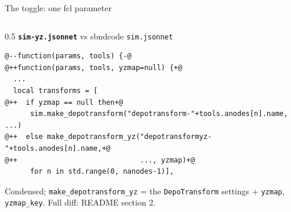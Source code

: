 \documentclass[aspectratio=169,10pt]{beamer}
\newcommand{\code}[1]{\texttt{#1}}
\begin{document}
\begin{frame}[fragile]{The toggle: one fcl parameter}
\begin{columns}[T]
\begin{column}{0.5\textwidth}
\vspace{1mm}
\textbf{\code{sim-yz.jsonnet}} vs sbndcode \code{sim.jsonnet}
\begin{lstlisting}[style=diff]
@--function(params, tools) {-@
@++function(params, tools, yzmap=null) {+@
  ...
  local transforms = [
@++  if yzmap == null then+@
      sim.make_depotransform("depotransform-"+tools.anodes[n].name, ...)
@++  else make_depotransform_yz("depotransformyz-"+tools.anodes[n].name,+@
@++                             ..., yzmap)+@
      for n in std.range(0, nanodes-1)],
\end{lstlisting}
\scriptsize Condensed; \code{make\_depotransform\_yz} = the \code{DepoTransform} settings + \code{yzmap}, \code{yzmap\_key}. Full diff: README section 2.
\end{column}
\end{columns}
\end{frame}
\end{document}
